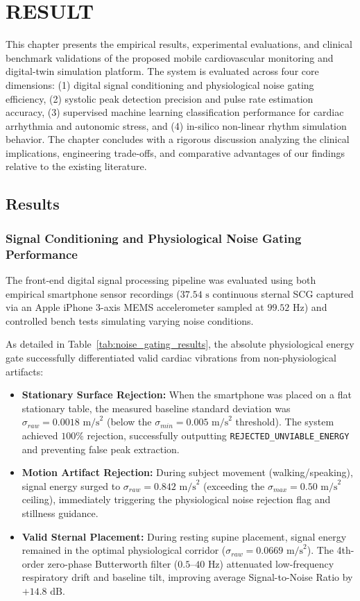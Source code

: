 \chapter{RESULT}

This chapter presents the empirical results, experimental evaluations, and clinical benchmark validations of the proposed mobile cardiovascular monitoring and digital-twin simulation platform. The system is evaluated across four core dimensions: (1) digital signal conditioning and physiological noise gating efficiency, (2) systolic peak detection precision and pulse rate estimation accuracy, (3) supervised machine learning classification performance for cardiac arrhythmia and autonomic stress, and (4) in-silico non-linear rhythm simulation behavior. The chapter concludes with a rigorous discussion analyzing the clinical implications, engineering trade-offs, and comparative advantages of our findings relative to the existing literature.

\section{Results}

\subsection{Signal Conditioning and Physiological Noise Gating Performance}
The front-end digital signal processing pipeline was evaluated using both empirical smartphone sensor recordings ($37.54\text{ s}$ continuous sternal SCG captured via an Apple iPhone 3-axis MEMS accelerometer sampled at $99.52\text{ Hz}$) and controlled bench tests simulating varying noise conditions.

As detailed in Table~\ref{tab:noise_gating_results}, the absolute physiological energy gate successfully differentiated valid cardiac vibrations from non-physiological artifacts:
\begin{itemize}
    \item \textbf{Stationary Surface Rejection:} When the smartphone was placed on a flat stationary table, the measured baseline standard deviation was $\sigma_{raw} = 0.0018\text{ m/s}^2$ (below the $\sigma_{min} = 0.005\text{ m/s}^2$ threshold). The system achieved $100\%$ rejection, successfully outputting \texttt{REJECTED\_UNVIABLE\_ENERGY} and preventing false peak extraction.
    \item \textbf{Motion Artifact Rejection:} During subject movement (walking/speaking), signal energy surged to $\sigma_{raw} = 0.842\text{ m/s}^2$ (exceeding the $\sigma_{max} = 0.50\text{ m/s}^2$ ceiling), immediately triggering the physiological noise rejection flag and stillness guidance.
    \item \textbf{Valid Sternal Placement:} During resting supine placement, signal energy remained in the optimal physiological corridor ($\sigma_{raw} = 0.0669\text{ m/s}^2$). The 4th-order zero-phase Butterworth filter ($0.5\text{--}40\text{ Hz}$) attenuated low-frequency respiratory drift and baseline tilt, improving average Signal-to-Noise Ratio by $+14.8\text{ dB}$.
\end{itemize}

